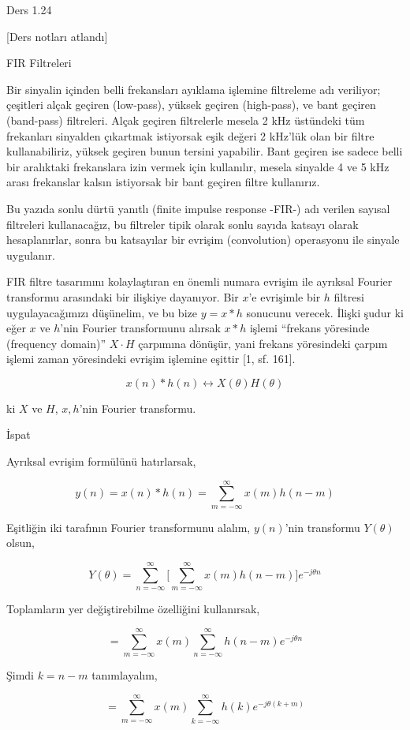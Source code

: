 \documentclass[12pt,fleqn]{article}\usepackage{../../common}
\begin{document}
Ders 1.24

[Ders notları atlandı]

FIR Filtreleri

Bir sinyalin içinden belli frekansları ayıklama işlemine filtreleme adı
veriliyor; çeşitleri alçak geçiren (low-pass), yüksek geçiren (high-pass),
ve bant geçiren (band-pass) filtreleri. Alçak geçiren filtrelerle mesela 2
kHz üstündeki tüm frekanları sinyalden çıkartmak istiyorsak eşik değeri 2
kHz'lük olan bir filtre kullanabiliriz, yüksek geçiren bunun tersini
yapabilir. Bant geçiren ise sadece belli bir aralıktaki frekanslara izin
vermek için kullanılır, mesela sinyalde 4 ve 5 kHz arası frekanslar kalsın
istiyorsak bir bant geçiren filtre kullanırız.

Bu yazıda sonlu dürtü yanıtlı (finite impulse response -FIR-) adı verilen
sayısal filtreleri kullanacağız, bu filtreler tipik olarak sonlu sayıda
katsayı olarak hesaplanırlar, sonra bu katsayılar bir evrişim
(convolution) operasyonu ile sinyale uygulanır.

FIR filtre tasarımını kolaylaştıran en önemli numara evrişim ile ayrıksal
Fourier transformu arasındaki bir ilişkiye dayanıyor. Bir $x$'e evrişimle
bir $h$ filtresi uygulayacağımızı düşünelim, ve bu bize $y = x * h$
sonucunu verecek. İlişki şudur ki eğer $x$ ve $h$'nin Fourier transformunu
alırsak $x * h$ işlemi ``frekans yöresinde (frequency domain)'' $X \cdot H$
çarpımına dönüşür, yani frekans yöresindeki çarpım işlemi zaman yöresindeki
evrişim işlemine eşittir [1, sf. 161].

$$ x(n) * h(n) \leftrightarrow X(\theta)H(\theta)$$

ki $X$ ve $H$, $x,h$'nin Fourier transformu.

İspat

Ayrıksal evrişim formülünü hatırlarsak,

$$ y(n) = x(n) * h(n) = \sum_{m=-\infty}^{\infty} x(m) h(n-m) $$

Eşitliğin iki tarafının Fourier transformunu alalım, $y(n)$'nin transformu
$Y(\theta)$ olsun,

$$  
Y(\theta) = \sum_{n=-\infty}^{\infty} \bigg[
\sum_{m=-\infty}^{\infty} x(m) h(n-m)
\bigg] e^{-j\theta n}
$$

Toplamların yer değiştirebilme özelliğini kullanırsak, 

$$ 
= \sum_{m=-\infty}^{\infty} x(m)  \sum_{n=-\infty}^{\infty} h(n-m)  e^{-j\theta n}
$$

Şimdi $k = n-m$ tanımlayalım, 

$$  
= \sum_{m=-\infty}^{\infty} x(m)  \sum_{k=-\infty}^{\infty} h(k)  e^{-j\theta (k+m)}
$$
\end{document}

